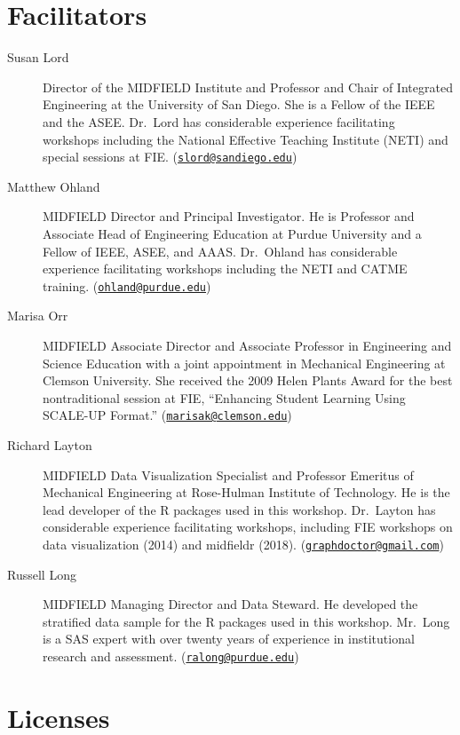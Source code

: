 \documentclass[
]{book}
\begin{document}
\hypertarget{facilitators}{%
\section*{Facilitators}\label{facilitators}}

\begin{description}
\item[Susan Lord]
Director of the MIDFIELD Institute and Professor and Chair of Integrated Engineering at the University of San Diego. She is a Fellow of the IEEE and the ASEE. Dr.~Lord has considerable experience facilitating workshops including the National Effective Teaching Institute (NETI) and special sessions at FIE. (\href{mailto:slord@sandiego.edu}{\nolinkurl{slord@sandiego.edu}})
\item[Matthew Ohland]
MIDFIELD Director and Principal Investigator. He is Professor and Associate Head of Engineering Education at Purdue University and a Fellow of IEEE, ASEE, and AAAS. Dr.~Ohland has considerable experience facilitating workshops including the NETI and CATME training. (\href{mailto:ohland@purdue.edu}{\nolinkurl{ohland@purdue.edu}})
\item[Marisa Orr]
MIDFIELD Associate Director and Associate Professor in Engineering and Science Education with a joint appointment in Mechanical Engineering at Clemson University. She received the 2009 Helen Plants Award for the best nontraditional session at FIE, ``Enhancing Student Learning Using SCALE-UP Format.'' (\href{mailto:marisak@clemson.edu}{\nolinkurl{marisak@clemson.edu}})
\item[Richard Layton]
MIDFIELD Data Visualization Specialist and Professor Emeritus of Mechanical Engineering at Rose-Hulman Institute of Technology. He is the lead developer of the R packages used in this workshop. Dr.~Layton has considerable experience facilitating workshops, including FIE workshops on data visualization (2014) and midfieldr (2018). (\href{mailto:graphdoctor@gmail.com}{\nolinkurl{graphdoctor@gmail.com}})
\item[Russell Long]
MIDFIELD Managing Director and Data Steward. He developed the stratified data sample for the R packages used in this workshop. Mr.~Long is a SAS expert with over twenty years of experience in institutional research and assessment. (\href{mailto:ralong@purdue.edu}{\nolinkurl{ralong@purdue.edu}})
\end{description}

\hypertarget{licenses}{%
\section*{Licenses}\label{licenses}}
\end{document}
